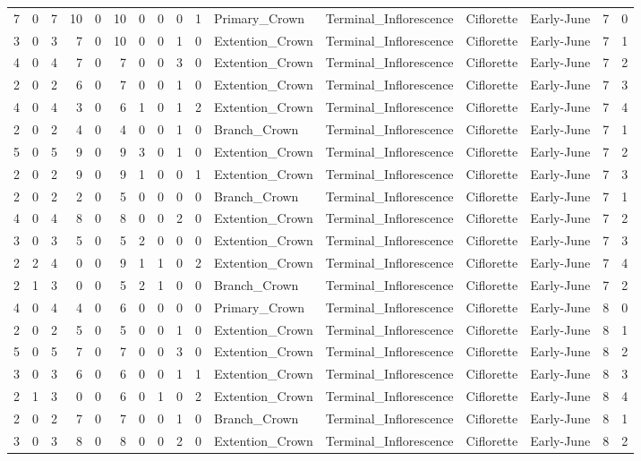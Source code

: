 \documentclass[]{article}
\begin{document}
\begin{longtable}[]{@{}rrrrrrrrrrllllrl@{}}
7 & 0 & 7 & 10 & 0 & 10 & 0 & 0 & 0 & 1 & Primary\_Crown &
Terminal\_Inflorescence & Ciflorette & Early-June & 7 & 0\tabularnewline
3 & 0 & 3 & 7 & 0 & 10 & 0 & 0 & 1 & 0 & Extention\_Crown &
Terminal\_Inflorescence & Ciflorette & Early-June & 7 & 1\tabularnewline
4 & 0 & 4 & 7 & 0 & 7 & 0 & 0 & 3 & 0 & Extention\_Crown &
Terminal\_Inflorescence & Ciflorette & Early-June & 7 & 2\tabularnewline
2 & 0 & 2 & 6 & 0 & 7 & 0 & 0 & 1 & 0 & Extention\_Crown &
Terminal\_Inflorescence & Ciflorette & Early-June & 7 & 3\tabularnewline
4 & 0 & 4 & 3 & 0 & 6 & 1 & 0 & 1 & 2 & Extention\_Crown &
Terminal\_Inflorescence & Ciflorette & Early-June & 7 & 4\tabularnewline
2 & 0 & 2 & 4 & 0 & 4 & 0 & 0 & 1 & 0 & Branch\_Crown &
Terminal\_Inflorescence & Ciflorette & Early-June & 7 & 1\tabularnewline
5 & 0 & 5 & 9 & 0 & 9 & 3 & 0 & 1 & 0 & Extention\_Crown &
Terminal\_Inflorescence & Ciflorette & Early-June & 7 & 2\tabularnewline
2 & 0 & 2 & 9 & 0 & 9 & 1 & 0 & 0 & 1 & Extention\_Crown &
Terminal\_Inflorescence & Ciflorette & Early-June & 7 & 3\tabularnewline
2 & 0 & 2 & 2 & 0 & 5 & 0 & 0 & 0 & 0 & Branch\_Crown &
Terminal\_Inflorescence & Ciflorette & Early-June & 7 & 1\tabularnewline
4 & 0 & 4 & 8 & 0 & 8 & 0 & 0 & 2 & 0 & Extention\_Crown &
Terminal\_Inflorescence & Ciflorette & Early-June & 7 & 2\tabularnewline
3 & 0 & 3 & 5 & 0 & 5 & 2 & 0 & 0 & 0 & Extention\_Crown &
Terminal\_Inflorescence & Ciflorette & Early-June & 7 & 3\tabularnewline
2 & 2 & 4 & 0 & 0 & 9 & 1 & 1 & 0 & 2 & Extention\_Crown &
Terminal\_Inflorescence & Ciflorette & Early-June & 7 & 4\tabularnewline
2 & 1 & 3 & 0 & 0 & 5 & 2 & 1 & 0 & 0 & Branch\_Crown &
Terminal\_Inflorescence & Ciflorette & Early-June & 7 & 2\tabularnewline
4 & 0 & 4 & 4 & 0 & 6 & 0 & 0 & 0 & 0 & Primary\_Crown &
Terminal\_Inflorescence & Ciflorette & Early-June & 8 & 0\tabularnewline
2 & 0 & 2 & 5 & 0 & 5 & 0 & 0 & 1 & 0 & Extention\_Crown &
Terminal\_Inflorescence & Ciflorette & Early-June & 8 & 1\tabularnewline
5 & 0 & 5 & 7 & 0 & 7 & 0 & 0 & 3 & 0 & Extention\_Crown &
Terminal\_Inflorescence & Ciflorette & Early-June & 8 & 2\tabularnewline
3 & 0 & 3 & 6 & 0 & 6 & 0 & 0 & 1 & 1 & Extention\_Crown &
Terminal\_Inflorescence & Ciflorette & Early-June & 8 & 3\tabularnewline
2 & 1 & 3 & 0 & 0 & 6 & 0 & 1 & 0 & 2 & Extention\_Crown &
Terminal\_Inflorescence & Ciflorette & Early-June & 8 & 4\tabularnewline
2 & 0 & 2 & 7 & 0 & 7 & 0 & 0 & 1 & 0 & Branch\_Crown &
Terminal\_Inflorescence & Ciflorette & Early-June & 8 & 1\tabularnewline
3 & 0 & 3 & 8 & 0 & 8 & 0 & 0 & 2 & 0 & Extention\_Crown &
Terminal\_Inflorescence & Ciflorette & Early-June & 8 & 2\tabularnewline

\end{longtable}
\end{document}
